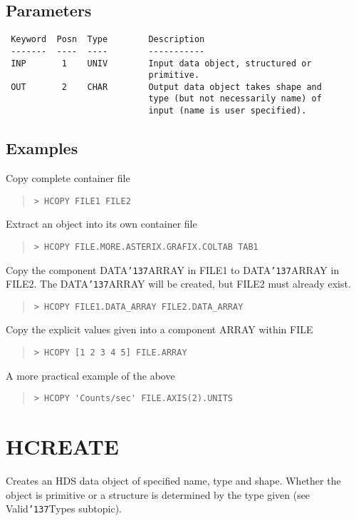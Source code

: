 \documentclass{book}
\renewcommand{\_}{{\tt\char'137}}     %
\begin{document}
\subsection{Parameters}
\begin{verbatim}
 Keyword  Posn  Type        Description
 -------  ----  ----        -----------
 INP       1    UNIV        Input data object, structured or
                            primitive.
 OUT       2    CHAR        Output data object takes shape and
                            type (but not necessarily name) of
                            input (name is user specified).

\end{verbatim}\subsection{Examples}
Copy complete container file
\begin{quote}\begin{verbatim}
> HCOPY FILE1 FILE2
\end{verbatim}\end{quote}
Extract an object into its own container file
\begin{quote}\begin{verbatim}
> HCOPY FILE.MORE.ASTERIX.GRAFIX.COLTAB TAB1
\end{verbatim}\end{quote}
Copy the component DATA\_ARRAY in FILE1
to DATA\_ARRAY in FILE2. The DATA\_ARRAY
will be created, but FILE2 must already exist.
\begin{quote}\begin{verbatim}
> HCOPY FILE1.DATA_ARRAY FILE2.DATA_ARRAY
\end{verbatim}\end{quote}
Copy the explicit values given into a component ARRAY within FILE
\begin{quote}\begin{verbatim}
> HCOPY [1 2 3 4 5] FILE.ARRAY
\end{verbatim}\end{quote}
A more practical example of the above
\begin{quote}\begin{verbatim}
> HCOPY 'Counts/sec' FILE.AXIS(2).UNITS
\end{verbatim}\end{quote}
\section{HCREATE}
Creates an HDS data object of specified name, type and
shape. Whether the object is primitive or a structure is
determined by the type given (see Valid\_Types subtopic).
\end{document}
